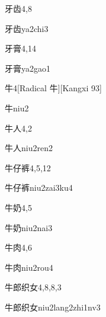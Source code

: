 \begin{entry}{牙齿}{4,8}
  \begin{phonetics}{牙齿}{ya2chi3}
  \end{phonetics}
\end{entry}

\begin{entry}{牙膏}{4,14}
  \begin{phonetics}{牙膏}{ya2gao1}
  \end{phonetics}
\end{entry}

\begin{entry}{牛}{4}[Radical 牛][Kangxi 93]
  \begin{phonetics}{牛}{niu2}
  \end{phonetics}
\end{entry}

\begin{entry}{牛人}{4,2}
  \begin{phonetics}{牛人}{niu2ren2}
  \end{phonetics}
\end{entry}

\begin{entry}{牛仔裤}{4,5,12}
  \begin{phonetics}{牛仔裤}{niu2zai3ku4}
  \end{phonetics}
\end{entry}

\begin{entry}{牛奶}{4,5}
  \begin{phonetics}{牛奶}{niu2nai3}
  \end{phonetics}
\end{entry}

\begin{entry}{牛肉}{4,6}
  \begin{phonetics}{牛肉}{niu2rou4}
  \end{phonetics}
\end{entry}

\begin{entry}{牛郎织女}{4,8,8,3}
  \begin{phonetics}{牛郎织女}{niu2lang2zhi1nv3}
  \end{phonetics}
\end{entry}

